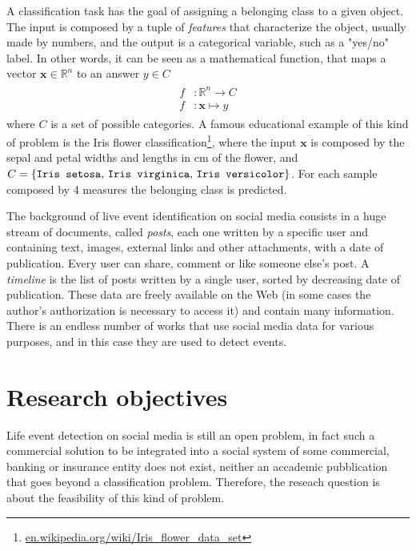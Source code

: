 A classification task has the goal of assigning a belonging class to a given object. The input is composed by a tuple of \emph{features} that characterize the object, usually made by numbers, and the output is a categorical variable, such as a "yes/no" label. In other words, it can be seen as a mathematical function, that maps a vector $ \boldsymbol{x} \in \mathbb{R}^n $ to an answer $ y \in C $
\begin{gather*}
\begin{split}
f & \colon \mathbb{R}^n \to C \\
f & \colon \boldsymbol{x} \mapsto y
\end{split}
\end{gather*}
where $C$ is a set of possible categories. A famous educational example of this kind of problem is the Iris flower classification\footnote{\url{en.wikipedia.org/wiki/Iris_flower_data_set}}, where the input $ \boldsymbol{x} $ is composed by the sepal and petal widths and lengths in cm of the flower, and $C = \{\text{\texttt{Iris setosa}, \texttt{Iris virginica}, \texttt{Iris versicolor}}\}$. For each sample composed by 4 measures the belonging class is predicted.

The background of live event identification on social media consists in a huge stream of documents, called \emph{posts}, each one written by a specific user and containing text, images, external links and other attachments, with a date of publication. Every user can share, comment or like someone else's post. A \emph{timeline} is the list of posts written by a single user, sorted by decreasing date of publication. These data are freely available on the Web (in some cases the author's authorization is necessary to access it) and contain many information. There is an endless number of works that use social media data for various purposes, and in this case they are used to detect events.

\section{Research objectives}
Life event detection on social media is still an open problem, in fact such a commercial solution to be integrated into a social system of some commercial, banking or insurance entity does not exist, neither an accademic pubblication that goes beyond a classification problem. Therefore, the reseach question is about the feasibility of this kind of problem.

